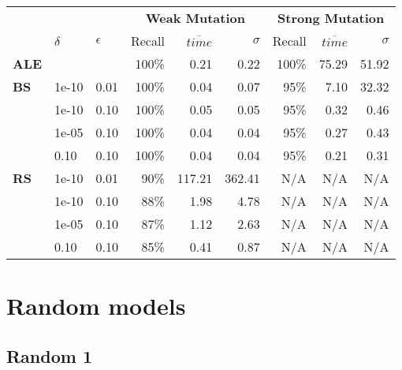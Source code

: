 \begin{small} 
\begin{tabular}{lll|r|r|r|r|r|r} 
 & & & \multicolumn{3}{c|}{\textbf{Weak Mutation}} & \multicolumn{3}{c}{\textbf{Strong Mutation}}\\ 
 & $\delta$ & $\epsilon$ & Recall & $\overline{time}$ & $\sigma$ & Recall & $\overline{time}$ & $\sigma$ \\  
\hline 
\textbf{ALE} & & & 100\% & 0.21  & 0.22  & 100\% & 75.29  & 51.92  \\ 
\textbf{BS}  & 1e-10  & 0.01  & 100\% & 0.04  & 0.07  & 95\% & 7.10  & 32.32\\
 & 1e-10  & 0.10  & 100\% & 0.05  & 0.05  & 95\% & 0.32  & 0.46\\
 & 1e-05  & 0.10  & 100\% & 0.04  & 0.04  & 95\% & 0.27  & 0.43\\
 & 0.10  & 0.10  & 100\% & 0.04  & 0.04  & 95\% & 0.21  & 0.31\\
\textbf{RS}  & 1e-10  & 0.01  & 90\% & 117.21  & 362.41 & N/A & N/A & N/A \\
 & 1e-10  & 0.10  & 88\% & 1.98  & 4.78 & N/A & N/A & N/A \\
 & 1e-05  & 0.10  & 87\% & 1.12  & 2.63 & N/A & N/A & N/A \\
 & 0.10  & 0.10  & 85\% & 0.41  & 0.87 & N/A & N/A & N/A \\
\end{tabular} 
\end{small} 

\section{Random models}

\subsection{Random 1}

